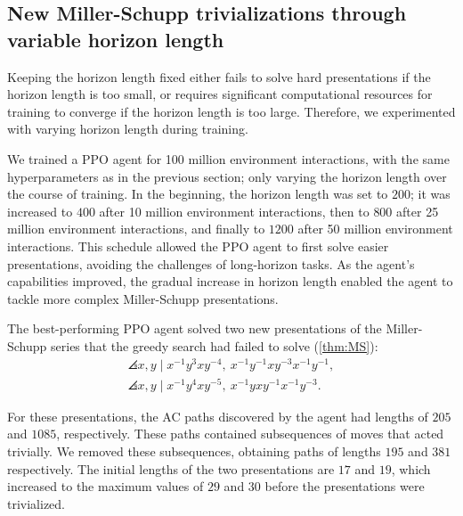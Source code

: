 \subsection{New Miller-Schupp trivializations through variable horizon length}\label{sec:variable_horizon}

Keeping the horizon length fixed either fails to solve hard presentations if the horizon length is too small, or requires significant computational resources for training to converge if the horizon length is too large. Therefore, we experimented with varying horizon length during training. 

We trained a PPO agent for 100 million environment interactions, with the same hyperparameters as in the previous section; only varying the horizon length over the course of training. In the beginning, the horizon length was set to $200$; it was increased to $400$ after 10 million environment interactions, then to $800$ after 25 million environment interactions, and finally to $1200$ after 50 million environment interactions.
This schedule allowed the PPO agent to first solve easier presentations, avoiding the challenges of long-horizon tasks. As the agent’s capabilities improved, the gradual increase in horizon length enabled the agent to tackle more complex Miller-Schupp presentations.

The best-performing PPO agent solved two new presentations of the Miller-Schupp series that the greedy search had failed to solve (\cref{thm:MS}):
	\begin{gather*}
		\angles{x, y \mid x^{-1} y^3 x y^{-4} , \ x^{-1} y^{-1} x y^{-3} x^{-1} y^{-1}}, \\
		\angles{x, y \mid x^{-1} y^4 x y^{-5} , \ x^{-1} y x y^{-1} x^{-1} y^{-3}}.
	\end{gather*}

For these presentations, the AC paths discovered by the agent had lengths of $205$ and $1085$, respectively. These paths contained subsequences of moves that acted trivially. We removed these subsequences, obtaining paths of lengths $195$ and $381$ respectively. The initial lengths of the two presentations are $17$ and $19$, which increased to the maximum values of $29$ and $30$ before the presentations were trivialized. 

